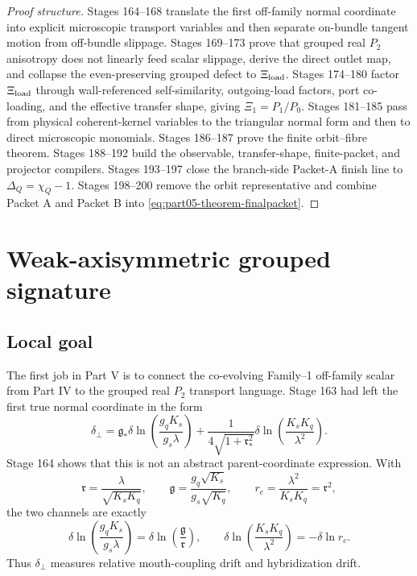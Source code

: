 \begin{proof}[Proof structure]
Stages 164--168 translate the first off-family normal coordinate into explicit microscopic transport variables and then separate on-bundle tangent motion from off-bundle slippage.  Stages 169--173 prove that grouped real \(P_2\) anisotropy does not linearly feed scalar slippage, derive the direct outlet map, and collapse the even-preserving grouped defect to \(\Xi_{\rm load}\).  Stages 174--180 factor \(\Xi_{\rm load}\) through wall-referenced self-similarity, outgoing-load factors, port co-loading, and the effective transfer shape, giving \(\Xi_1=P_1/P_0\).  Stages 181--185 pass from physical coherent-kernel variables to the triangular normal form and then to direct microscopic monomials.  Stages 186--187 prove the finite orbit--fibre theorem.  Stages 188--192 build the observable, transfer-shape, finite-packet, and projector compilers.  Stages 193--197 close the branch-side Packet-A finish line to \(\Delta_Q=\chi_Q-1\).  Stages 198--200 remove the orbit representative and combine Packet A and Packet B into \eqref{eq:part05-theorem-finalpacket}.
\end{proof}

\section{Weak-axisymmetric grouped signature}
\label{sec:part05_weak_axisymmetric_orbit:weak-axisymmetric-grouped-signature}

\subsection{Local goal}
The first job in Part V is to connect the co-evolving Family--1 off-family scalar from Part IV to the grouped real \(P_2\) transport language.  Stage 163 had left the first true normal coordinate in the form
\begin{equation}
\label{eq:part05-delta-perp-original}
\delta_\perp
=
\mathfrak g_*
\delta\ln\!\left(\frac{g_qK_s}{g_s\lambda}\right)
+
\frac{1}{4\sqrt{1+\mathfrak r_*^2}}
\delta\ln\!\left(\frac{K_sK_q}{\lambda^2}\right).
\end{equation}
Stage 164 shows that this is not an abstract parent-coordinate expression.  With
\begin{equation}
\label{eq:part05-rg-defs}
\mathfrak r=\frac{\lambda}{\sqrt{K_sK_q}},
\qquad
\mathfrak g=\frac{g_q\sqrt{K_s}}{g_s\sqrt{K_q}},
\qquad
r_c=\frac{\lambda^2}{K_sK_q}=\mathfrak r^2,
\end{equation}
the two channels are exactly
\begin{equation}
\label{eq:part05-log-channels-rg}
\delta\ln\!\left(\frac{g_qK_s}{g_s\lambda}\right)
=
\delta\ln\!\left(\frac{\mathfrak g}{\mathfrak r}\right),
\qquad
\delta\ln\!\left(\frac{K_sK_q}{\lambda^2}\right)
=-\delta\ln r_c.
\end{equation}
Thus \(\delta_\perp\) measures relative mouth-coupling drift and hybridization drift.

